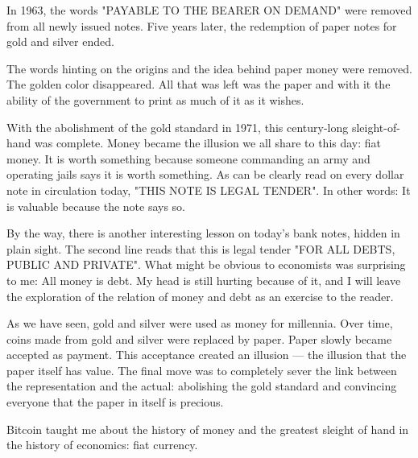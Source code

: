 
In 1963, the words "PAYABLE TO THE BEARER ON DEMAND" were removed from
all newly issued notes. Five years later, the redemption of paper notes
for gold and silver ended.

The words hinting on the origins and the idea behind paper money were
removed. The golden color disappeared. All that was left was the paper
and with it the ability of the government to print as much of it as it
wishes.

With the abolishment of the gold standard in 1971, this century-long
sleight-of-hand was complete. Money became the illusion we all share to
this day: fiat money. It is worth something because someone commanding
an army and operating jails says it is worth something. As can be
clearly read on every dollar note in circulation today, "THIS NOTE IS
LEGAL TENDER". In other words: It is valuable because the note says so.


By the way, there is another interesting lesson on today's bank notes,
hidden in plain sight. The second line reads that this is legal tender
"FOR ALL DEBTS, PUBLIC AND PRIVATE". What might be obvious to economists
was surprising to me: All money is debt. My head is still hurting
because of it, and I will leave the exploration of the relation of money
and debt as an exercise to the reader.

As we have seen, gold and silver were used as money for millennia. Over
time, coins made from gold and silver were replaced by paper. Paper
slowly became accepted as payment. This acceptance created an
illusion --- the illusion that the paper itself has value. The final
move was to completely sever the link between the representation and the
actual: abolishing the gold standard and convincing everyone that the
paper in itself is precious.

Bitcoin taught me about the history of money and the greatest sleight of
hand in the history of economics: fiat currency.

